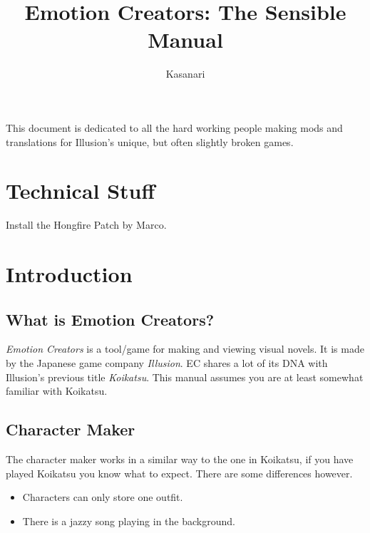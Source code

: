 \documentclass{report}
\title{Emotion Creators: The Sensible Manual}
\author{Kasanari}
\begin{document}
\begin{titlepage}
\maketitle
\end{titlepage}




\begin{titlepage}
\begin{center}
    This document is dedicated to all the hard working people making mods and translations for Illusion's unique, but often slightly broken games.
\end{center}
\end{titlepage}



\newpage

\setcounter{page}{1}

\chapter{Technical Stuff}

Install the Hongfire Patch by Marco.

\chapter{Introduction}

\section{What is Emotion Creators?}

\textit{Emotion Creators} is a tool/game for making and viewing visual novels. It is made by the Japanese game company \textit{Illusion}. EC shares a lot of its DNA with Illusion's previous title \textit{Koikatsu}. This manual assumes you are at least somewhat familiar with Koikatsu.

\section{Character Maker}

The character maker works in a similar way to the one in Koikatsu, if you have played Koikatsu you know what to expect. There are some differences however.
\begin{itemize}
    \item Characters can only store one outfit.
    \item There is a jazzy song playing in the background.
\end{itemize}
\end{document}
